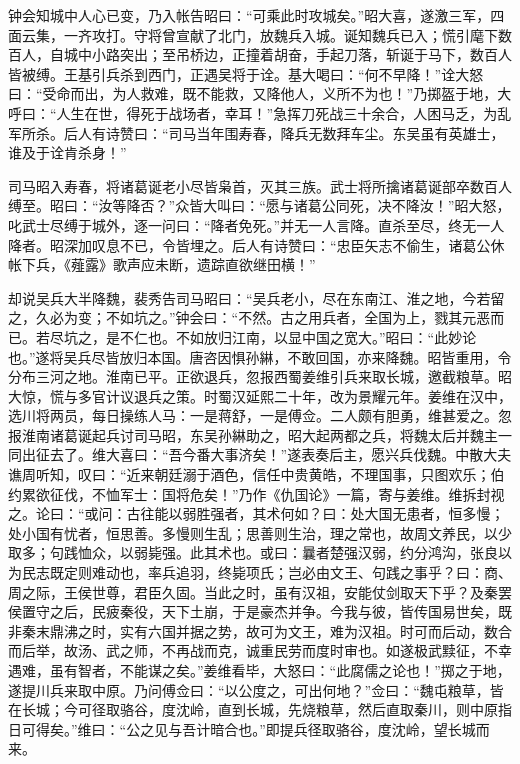 钟会知城中人心已变，乃入帐告昭曰：“可乘此时攻城矣。”昭大喜，遂激三军，四面云集，一齐攻打。守将曾宣献了北门，放魏兵入城。诞知魏兵已入；慌引麾下数百人，自城中小路突出；至吊桥边，正撞着胡奋，手起刀落，斩诞于马下，数百人皆被缚。王基引兵杀到西门，正遇吴将于诠。基大喝曰：“何不早降！”诠大怒曰：“受命而出，为人救难，既不能救，又降他人，义所不为也！”乃掷盔于地，大呼曰：“人生在世，得死于战场者，幸耳！”急挥刀死战三十余合，人困马乏，为乱军所杀。后人有诗赞曰：“司马当年围寿春，降兵无数拜车尘。东吴虽有英雄士，谁及于诠肯杀身！”

司马昭入寿春，将诸葛诞老小尽皆枭首，灭其三族。武士将所擒诸葛诞部卒数百人缚至。昭曰：“汝等降否？”众皆大叫曰：“愿与诸葛公同死，决不降汝！”昭大怒，叱武士尽缚于城外，逐一问曰：“降者免死。”并无一人言降。直杀至尽，终无一人降者。昭深加叹息不已，令皆埋之。后人有诗赞曰：“忠臣矢志不偷生，诸葛公休帐下兵，《薤露》歌声应未断，遗踪直欲继田横！”

却说吴兵大半降魏，裴秀告司马昭曰：“吴兵老小，尽在东南江、淮之地，今若留之，久必为变；不如坑之。”钟会曰：“不然。古之用兵者，全国为上，戮其元恶而已。若尽坑之，是不仁也。不如放归江南，以显中国之宽大。”昭曰：“此妙论也。”遂将吴兵尽皆放归本国。唐咨因惧孙綝，不敢回国，亦来降魏。昭皆重用，令分布三河之地。淮南已平。正欲退兵，忽报西蜀姜维引兵来取长城，邀截粮草。昭大惊，慌与多官计议退兵之策。时蜀汉延熙二十年，改为景耀元年。姜维在汉中，选川将两员，每日操练人马：一是蒋舒，一是傅佥。二人颇有胆勇，维甚爱之。忽报淮南诸葛诞起兵讨司马昭，东吴孙綝助之，昭大起两都之兵，将魏太后并魏主一同出征去了。维大喜曰：“吾今番大事济矣！”遂表奏后主，愿兴兵伐魏。中散大夫谯周听知，叹曰：“近来朝廷溺于酒色，信任中贵黄皓，不理国事，只图欢乐；伯约累欲征伐，不恤军士：国将危矣！”乃作《仇国论》一篇，寄与姜维。维拆封视之。论曰：“或问：古往能以弱胜强者，其术何如？曰：处大国无患者，恒多慢；处小国有忧者，恒思善。多慢则生乱；思善则生治，理之常也，故周文养民，以少取多；句践恤众，以弱毙强。此其术也。或曰：曩者楚强汉弱，约分鸿沟，张良以为民志既定则难动也，率兵追羽，终毙项氏；岂必由文王、句践之事乎？曰：商、周之际，王侯世尊，君臣久固。当此之时，虽有汉祖，安能仗剑取天下乎？及秦罢侯置守之后，民疲秦役，天下土崩，于是豪杰并争。今我与彼，皆传国易世矣，既非秦末鼎沸之时，实有六国并据之势，故可为文王，难为汉祖。时可而后动，数合而后举，故汤、武之师，不再战而克，诚重民劳而度时审也。如遂极武黩征，不幸遇难，虽有智者，不能谋之矣。”姜维看毕，大怒曰：“此腐儒之论也！”掷之于地，遂提川兵来取中原。乃问傅佥曰：“以公度之，可出何地？”佥曰：“魏屯粮草，皆在长城；今可径取骆谷，度沈岭，直到长城，先烧粮草，然后直取秦川，则中原指日可得矣。”维曰：“公之见与吾计暗合也。”即提兵径取骆谷，度沈岭，望长城而来。

